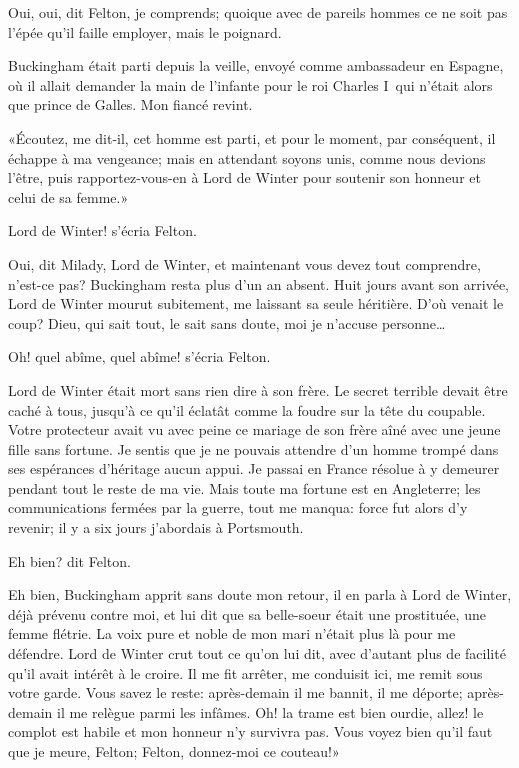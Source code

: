 \speak  Oui, oui, dit Felton, je comprends; quoique avec de pareils hommes ce ne soit pas l'épée qu'il faille employer, mais le poignard. 

\speak  Buckingham était parti depuis la veille, envoyé comme ambassadeur en Espagne, où il allait demander la main de l'infante pour le roi Charles I\ier\, qui n'était alors que prince de Galles. Mon fiancé revint. 

«Écoutez, me dit-il, cet homme est parti, et pour le moment, par conséquent, il échappe à ma vengeance; mais en attendant soyons unis, comme nous devions l'être, puis rapportez-vous-en à Lord de Winter pour soutenir son honneur et celui de sa femme.» 

\speak  Lord de Winter! s'écria Felton. 

\speak  Oui, dit Milady, Lord de Winter, et maintenant vous devez tout comprendre, n'est-ce pas? Buckingham resta plus d'un an absent. Huit jours avant son arrivée, Lord de Winter mourut subitement, me laissant sa seule héritière. D'où venait le coup? Dieu, qui sait tout, le sait sans doute, moi je n'accuse personne\dots 

\speak  Oh! quel abîme, quel abîme! s'écria Felton. 

\speak  Lord de Winter était mort sans rien dire à son frère. Le secret terrible devait être caché à tous, jusqu'à ce qu'il éclatât comme la foudre sur la tête du coupable. Votre protecteur avait vu avec peine ce mariage de son frère aîné avec une jeune fille sans fortune. Je sentis que je ne pouvais attendre d'un homme trompé dans ses espérances d'héritage aucun appui. Je passai en France résolue à y demeurer pendant tout le reste de ma vie. Mais toute ma fortune est en Angleterre; les communications fermées par la guerre, tout me manqua: force fut alors d'y revenir; il y a six jours j'abordais à Portsmouth. 

\speak  Eh bien? dit Felton. 

\speak  Eh bien, Buckingham apprit sans doute mon retour, il en parla à Lord de Winter, déjà prévenu contre moi, et lui dit que sa belle-soeur était une prostituée, une femme flétrie. La voix pure et noble de mon mari n'était plus là pour me défendre. Lord de Winter crut tout ce qu'on lui dit, avec d'autant plus de facilité qu'il avait intérêt à le croire. Il me fit arrêter, me conduisit ici, me remit sous votre garde. Vous savez le reste: après-demain il me bannit, il me déporte; après-demain il me relègue parmi les infâmes. Oh! la trame est bien ourdie, allez! le complot est habile et mon honneur n'y survivra pas. Vous voyez bien qu'il faut que je meure, Felton; Felton, donnez-moi ce couteau!» 

